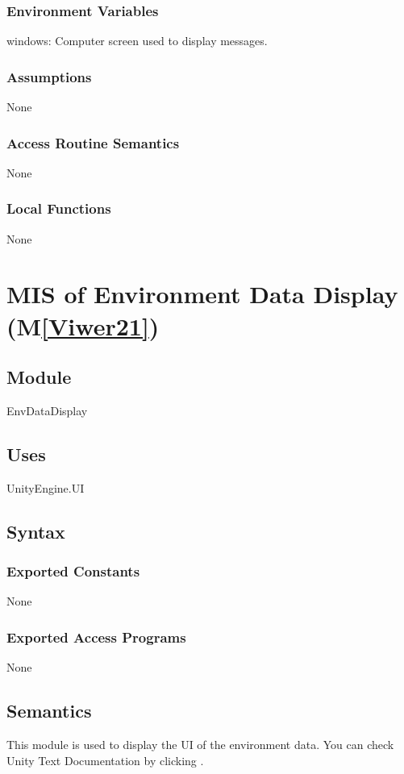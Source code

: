 \documentclass[12pt, titlepage]{article}
\newcommand{\mref}[1]{M\ref{#1}}
\begin{document}
\subsubsection{Environment Variables}
windows: Computer screen used to display messages.

\subsubsection{Assumptions}
None

\subsubsection{Access Routine Semantics}
None



\subsubsection{Local Functions}
None

\newpage


\section{MIS of Environment Data Display (\mref{Viwer21})} 

\subsection{Module}
EnvDataDisplay

\subsection{Uses}
UnityEngine.UI 

\subsection{Syntax}

\subsubsection{Exported Constants}
None
\subsubsection{Exported Access Programs}
None

\subsection{Semantics}
This module is used to display the UI of the environment data. 
You can check Unity Text Documentation by clicking \tref.
\end{document}
